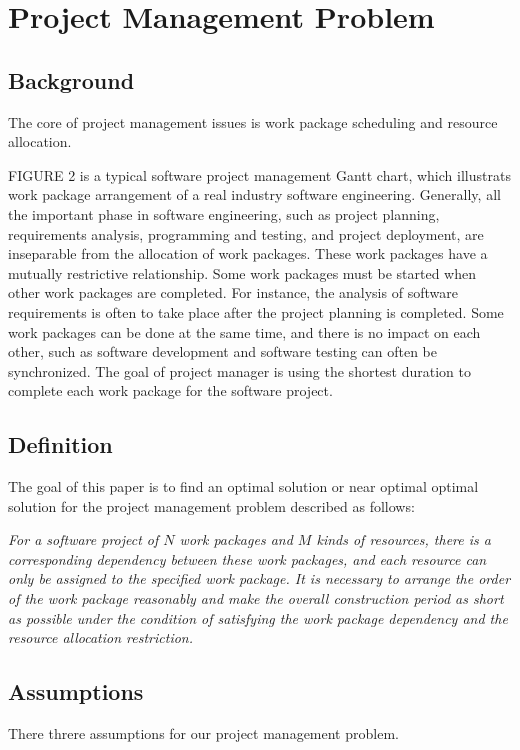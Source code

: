 
\section{Project Management Problem}
%

\subsection{Background}
%

The core of project management issues is work package scheduling and
resource allocation.


FIGURE 2 is a typical software project management Gantt chart, which
illustrats work package arrangement of a real industry software
engineering.  Generally, all the important phase in software
engineering, such as project planning, requirements analysis,
programming and testing, and project deployment, are inseparable from
the allocation of work packages.  These work packages have a mutually
restrictive relationship.  Some work packages must be started when
other work packages are completed.  For instance, the analysis of
software requirements is often to take place after the project
planning is completed.  Some work packages can be done at the same
time, and there is no impact on each other, such as software
development and software testing can often be synchronized.  The goal
of project manager is using the shortest duration to complete each
work package for the software project.


\subsection{Definition}
%
The goal of this paper is to find an optimal solution or near optimal
optimal solution for the project management problem described as
follows:

\emph{
  For a software project of $N$ work packages and $M$ kinds of
  resources, there is a corresponding dependency between these work
  packages, and each resource can only be assigned to the specified
  work package.  It is necessary to arrange the order of the work
  package reasonably and make the overall construction period as short
  as possible under the condition of satisfying the work package
  dependency and the resource allocation restriction.
}


\subsection{Assumptions}
%
There threre assumptions for our project management problem.

